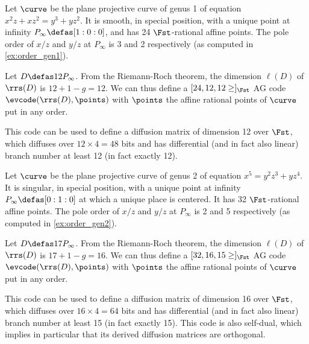 \begin{example}
\label{ex:genus1}
Let $\curve$ be the plane projective curve of genus 1 of equation $x^2z + xz^2 = y^3 + yz^2$. It is smooth, in special position,
with a unique point at infinity $P_\infty \defas [1:0:0]$, and has 24 $\Fst$-rational affine points. The pole order
of $x/z$ and $y/z$ at $P_\infty$ is 3 and 2 respectively (as computed in \autoref{ex:order_gen1}).

Let $D \defas 12P_\infty$. From the Riemann-Roch theorem, the dimension $\ell(D)$ of $\rrs(D)$ is $12 + 1 - g = 12$. We can thus
define a $[24, 12, 12 \geq]_{\Fst}$ AG code $\evcode(\rrs(D), \points)$ with $\points$ the affine rational points of $\curve$
put in any order.

This code can be used to define a diffusion matrix of dimension 12 over $\Fst$, which diffuses over $12\times 4 = 48$ bits and
has differential (and in fact also linear) branch number at least 12 (in fact exactly 12). 
\end{example}

\begin{example}
\label{ex:genus2}
Let $\curve$ be the plane projective curve of genus 2 of equation $x^5 = y^2z^3 + yz^4$. It is singular, in special position,
with a unique point at infinity $P_\infty \defas [0:1:0]$ at which a unique place is centered. It has 32 $\Fst$-rational affine points. The pole order
of $x/z$ and $y/z$ at $P_\infty$ is 2 and 5 respectively (as computed in \autoref{ex:order_gen2}).

Let $D \defas 17P_\infty$. From the Riemann-Roch theorem, the dimension $\ell(D)$ of $\rrs(D)$ is $17 + 1 - g = 16$. We can thus
define a $[32, 16, 15 \geq]_{\Fst}$ AG code $\evcode(\rrs(D), \points)$ with $\points$ the affine rational points of $\curve$
put in any order.

This code can be used to define a diffusion matrix of dimension 16 over $\Fst$, which diffuses over $16\times 4 = 64$ bits and
has differential (and in fact also linear) branch number at least 15 (in fact exactly 15). This code is also self-dual,
which implies in particular that its derived diffusion matrices are orthogonal.
\end{example}
